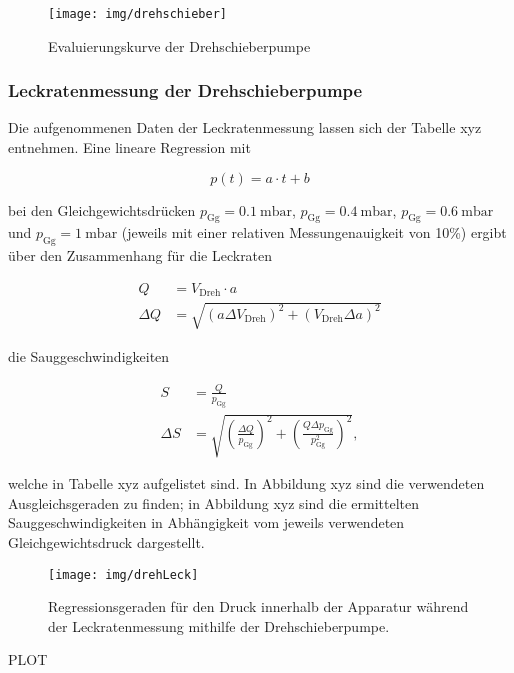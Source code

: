 			
			
			
			
			\begin{figure}
			\centering
			\texttt{[image: img/drehschieber]}
			\caption{Evaluierungskurve der Drehschieberpumpe}
			\label{fig:drehschieber}
			\end{figure}

			
		\subsubsection{Leckratenmessung der Drehschieberpumpe}
		
			Die aufgenommenen Daten der Leckratenmessung lassen sich der Tabelle xyz entnehmen. Eine lineare Regression mit
			
			\begin{equation}
				p(t) = a \cdot t + b
			\end{equation}
			
			bei den Gleichgewichtsdrücken $p_\text{Gg} = \SI{0.1}{\milli \bar}$, $p_\text{Gg} = \SI{0.4}{\milli \bar}$, $p_\text{Gg} = \SI{0.6}{\milli \bar}$ und $p_\text{Gg} = \SI{1}{\milli \bar}$ (jeweils mit einer relativen Messungenauigkeit von 10\%) ergibt über den Zusammenhang für die Leckraten
			
			
			\begin{align}
				Q &= V_\text{Dreh} \cdot a\\
				\Delta Q &= \sqrt{\left(a \Delta V_\text{Dreh} \right)^2 + \left(V_\text{Dreh} \Delta a\right)^2}
			\end{align}
			
			die Sauggeschwindigkeiten
			
			\begin{align}
				S &= \frac{Q}{p_\text{Gg}}\\
				\Delta S &= \sqrt{\left(\frac{\Delta Q}{p_\text{Gg}}\right)^2 + \left(\frac{Q \Delta p_\text{Gg}}{p_\text{Gg}^2}\right)^2},
			\end{align}
			
			welche in Tabelle xyz aufgelistet sind. In Abbildung xyz sind die verwendeten Ausgleichsgeraden zu finden; in Abbildung xyz sind die ermittelten Sauggeschwindigkeiten in Abhängigkeit vom jeweils verwendeten Gleichgewichtsdruck dargestellt. 
			
			
			

			\begin{figure}
			\centering
			\texttt{[image: img/drehLeck]}
			\caption{Regressionsgeraden für den Druck innerhalb der Apparatur während der Leckratenmessung mithilfe der Drehschieberpumpe.}
			\label{fig:drehLeck}
			\end{figure}
			PLOT

